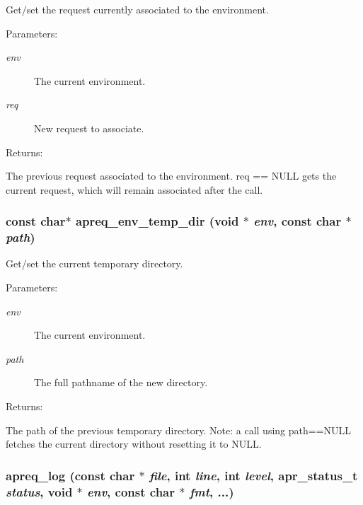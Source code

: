 Get/set the request currently associated to the environment. \begin{Desc}
\item[Parameters: ]\par
\begin{description}
\item[{\em 
env}]The current environment. \item[{\em 
req}]New request to associate. \end{description}
\end{Desc}
\begin{Desc}
\item[Returns: ]\par
The previous request associated to the environment. req == NULL gets the current request, which will remain associated after the call. \end{Desc}
\subsubsection{\setlength{\rightskip}{0pt plus 5cm}const char$\ast$ apreq\_\-env\_\-temp\_\-dir ({\bf void} $\ast$ {\em env}, const char $\ast$ {\em path})}\label{group__ENV_a9}


Get/set the current temporary directory. \begin{Desc}
\item[Parameters: ]\par
\begin{description}
\item[{\em 
env}]The current environment. \item[{\em 
path}]The full pathname of the new directory. \end{description}
\end{Desc}
\begin{Desc}
\item[Returns: ]\par
The path of the previous temporary directory. Note: a call using path==NULL fetches the current directory without resetting it to NULL. \end{Desc}
\subsubsection{ apreq\_\-log (const char $\ast$ {\em file}, {\bf int} {\em line}, {\bf int} {\em level}, {\bf apr\_\-status\_\-t} {\em status}, {\bf void} $\ast$ {\em env}, const char $\ast$ {\em fmt}, ...)}\label{group__ENV_a1}


